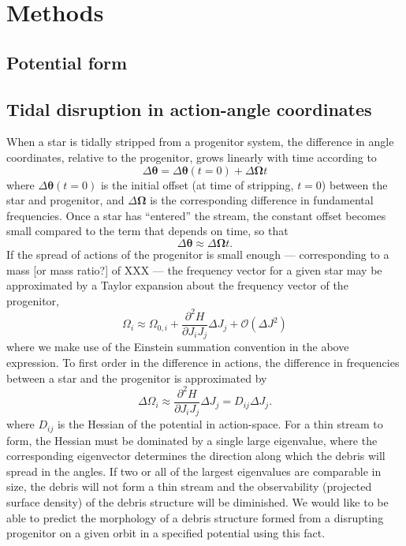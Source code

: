 \documentclass[letterpaper,12pt,preprint]{aastex}
\newcommand{\bs}[1]{\boldsymbol{#1}}
\begin{document}
\section{Methods}\label{sec:methods}
\subsection{Potential form}

\subsection{Tidal disruption in action-angle coordinates}
When a star is tidally stripped from a progenitor system, the difference in angle coordinates, relative to the progenitor, grows linearly with time according to
\begin{equation}
	\Delta\bs{\theta} = \Delta\bs{\theta}(t=0) + \Delta\bs{\Omega}t
\end{equation}
where $\Delta\bs{\theta}(t=0)$ is the initial offset (at time of stripping, $t=0$) between the star and progenitor, and $\Delta\bs{\Omega}$ is the corresponding difference in fundamental frequencies. Once a star has ``entered'' the stream, the constant offset becomes small compared to the term that depends on time, so that
\begin{equation}
	\Delta\bs{\theta} \approx \Delta\bs{\Omega}t.
\end{equation}
If the spread of actions of the progenitor is small enough --- corresponding to a mass [or mass ratio?] of XXX --- the frequency vector for a given star may be approximated by a Taylor expansion about the frequency vector of the progenitor,
\begin{equation}
	\Omega_i \approx \Omega_{0,i} + \frac{\partial^2 H}{\partial J_i J_j}\Delta J_j + \mathcal{O}(\Delta J^2)
\end{equation}
where we make use of the Einstein summation convention in the above expression. To first order in the difference in actions, the difference in frequencies between a star and the progenitor is approximated by
\begin{equation}
	\Delta\Omega_i \approx \frac{\partial^2 H}{\partial J_i J_j}\Delta J_j = D_{ij}\Delta J_j.\label{eq:deltafreq}
\end{equation}
where $D_{ij}$ is the Hessian of the potential in action-space. For a thin stream to form, the Hessian must be dominated by a single large eigenvalue, where the corresponding eigenvector determines the direction along which the debris will spread in the angles. If two or all of the largest eigenvalues are comparable in size, the debris will not form a thin stream and the observability (projected surface density) of the debris structure will be diminished. We would like to be able to predict the morphology of a debris structure formed from a disrupting progenitor on a given orbit in a specified potential using this fact.
\end{document}
